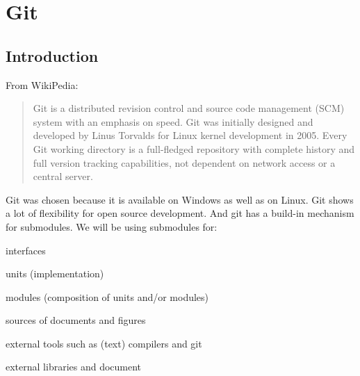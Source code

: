 \chapter{Git}
\label{sec:share000.git}
\section{Introduction}
\label{sec:share000.git.introduction}

From WikiPedia:
\begin{quote}
Git is a distributed revision control and source code management (SCM) system
with an emphasis on speed. Git was initially designed and developed by Linus
Torvalds for Linux kernel development in 2005. Every Git working directory is
a full-fledged repository with complete history and full version tracking
capabilities, not dependent on network access or a central server.
\end{quote}

\noindent
Git was chosen because it is available on Windows as well as on Linux. Git
shows a lot of flexibility for open source development. And git has a build-in
mechanism for submodules. We will be using submodules for:
\begin{itemize*}
\item interfaces
\item units (implementation)
\item modules (composition of units and/or modules)
\item sources of documents and figures
\item external tools such as (text) compilers and git
\item external libraries and document
\end{itemize*}

